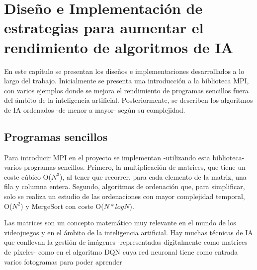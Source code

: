 

\chapter{Diseño e Implementación de estrategias para aumentar el rendimiento de algoritmos de IA}
\label{cap:c3_implementaciones}	


	
	En este capítulo se presentan los diseños e implementaciones desarrollados a lo largo del trabajo. Inicialmente se presenta una introducción a la biblioteca MPI, con varios ejemplos donde se mejora el rendimiento de programas sencillos fuera del ámbito de la inteligencia artificial. Posteriormente, se describen los algoritmos de IA ordenados -de menor a mayor- según su complejidad.

\section{Programas sencillos}
\label{cap:c3_1}

	Para introducir MPI en el proyecto se implementan -utilizando esta biblioteca- varios programas sencillos. Primero, la multiplicación de matrices, que tiene un coste cúbico O(\(N^{3}\)), al tener que recorrer, para cada elemento de la matriz, una fila y columna entera. Segundo, algoritmos de ordenación que, para simplificar, solo se realiza un estudio de las ordenaciones con mayor complejidad temporal, O(\(N^{2}\)) y MergeSort con coste O(\(N*logN\)).


	Las matrices son un concepto matemático muy relevante en el mundo de los videojuegos y en el ámbito de la inteligencia artificial. Hay muchas técnicas de IA que conllevan la gestión de imágenes -representadas digitalmente como matrices de píxeles- como en el algoritmo DQN cuya red neuronal tiene como entrada varios fotogramas para poder aprender
	
